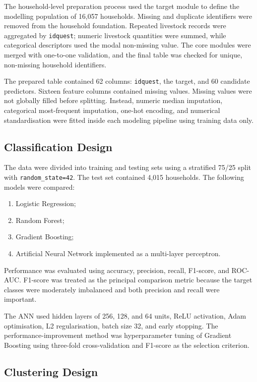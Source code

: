\documentclass[12pt,a4paper]{article}
\begin{document}
The household-level preparation process used the target module to define the modelling population of 16,057 households. Missing and duplicate identifiers were removed from the household foundation. Repeated livestock records were aggregated by \texttt{idquest}; numeric livestock quantities were summed, while categorical descriptors used the modal non-missing value. The core modules were merged with one-to-one validation, and the final table was checked for unique, non-missing household identifiers.

The prepared table contained 62 columns: \texttt{idquest}, the target, and 60 candidate predictors. Sixteen feature columns contained missing values. Missing values were not globally filled before splitting. Instead, numeric median imputation, categorical most-frequent imputation, one-hot encoding, and numerical standardisation were fitted inside each modeling pipeline using training data only.

\subsection{Classification Design}

The data were divided into training and testing sets using a stratified 75/25 split with \texttt{random\_state=42}. The test set contained 4,015 households. The following models were compared:

\begin{enumerate}[leftmargin=2em]
    \item Logistic Regression;
    \item Random Forest;
    \item Gradient Boosting;
    \item Artificial Neural Network implemented as a multi-layer perceptron.
\end{enumerate}

Performance was evaluated using accuracy, precision, recall, F1-score, and ROC-AUC. F1-score was treated as the principal comparison metric because the target classes were moderately imbalanced and both precision and recall were important.

The ANN used hidden layers of 256, 128, and 64 units, ReLU activation, Adam optimisation, L2 regularisation, batch size 32, and early stopping. The performance-improvement method was hyperparameter tuning of Gradient Boosting using three-fold cross-validation and F1-score as the selection criterion.

\subsection{Clustering Design}
\end{document}
